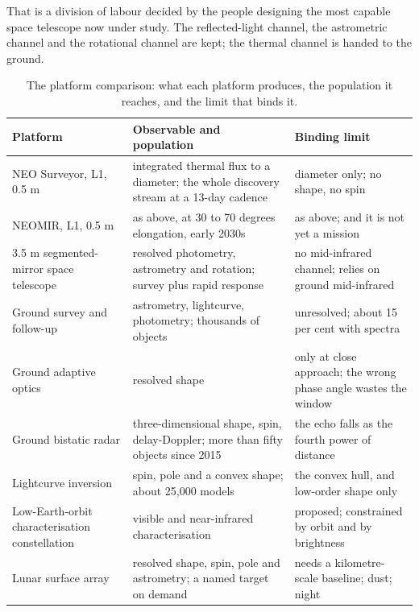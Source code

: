 That is a division of labour decided by the people designing the most
capable space telescope now under study. The reflected-light channel, the
astrometric channel and the rotational channel are kept; the thermal channel
is handed to the ground.

\begin{table}[!htbp]
\centering
\small
\caption{The platform comparison: what each platform produces, the
population it reaches, and the limit that binds it.}
\label{tab:platforms}
\begin{tabularx}{\textwidth}{@{}P{1.28in}P{1.28in}Y@{}}
\toprule
{}
\textbf{Platform} & \textbf{Observable and population} & \textbf{Binding
limit} \\
\midrule
NEO Surveyor, L1, 0.5 m & integrated thermal flux to a diameter; the whole
discovery stream at a 13-day cadence & diameter only; no shape, no spin \\
NEOMIR, L1, 0.5 m & as above, at 30 to 70 degrees elongation, early 2030s &
as above; and it is not yet a mission \\
3.5 m segmented-mirror space telescope & resolved photometry, astrometry and
rotation; survey plus rapid response & no mid-infrared channel; relies on
ground mid-infrared \\
Ground survey and follow-up & astrometry, lightcurve, photometry; thousands
of objects & unresolved; about 15 per cent with spectra \\
Ground adaptive optics & resolved shape & only at close approach; the wrong
phase angle wastes the window \\
Ground bistatic radar & three-dimensional shape, spin, delay-Doppler; more
than fifty objects since 2015 & the echo falls as the fourth power of
distance \\
Lightcurve inversion & spin, pole and a convex shape; about 25,000 models &
the convex hull, and low-order shape only \\
Low-Earth-orbit characterisation constellation & visible and near-infrared
characterisation & proposed; constrained by orbit and by brightness \\
Lunar surface array & resolved shape, spin, pole and astrometry; a named
target on demand & needs a kilometre-scale baseline; dust; night \\
\bottomrule
\end{tabularx}
\end{table}

